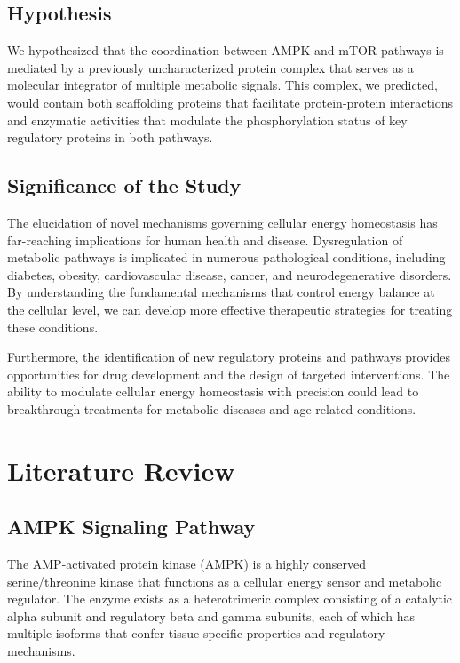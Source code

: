 \documentclass[11
pt,a4paper]{article}
\begin{document}


\subsection{Hypothesis}

We hypothesized that the coordination between AMPK and mTOR pathways is mediated by a previously uncharacterized protein complex that serves as a molecular integrator of multiple metabolic signals. This complex, we predicted, would contain both scaffolding proteins that facilitate protein-protein interactions and enzymatic activities that modulate the phosphorylation status of key regulatory proteins in both pathways.

\subsection{Significance of the Study}

The elucidation of novel mechanisms governing cellular energy homeostasis has far-reaching implications for human health and disease. Dysregulation of metabolic pathways is implicated in numerous pathological conditions, including diabetes, obesity, cardiovascular disease, cancer, and neurodegenerative disorders. By understanding the fundamental mechanisms that control energy balance at the cellular level, we can develop more effective therapeutic strategies for treating these conditions.

Furthermore, the identification of new regulatory proteins and pathways provides opportunities for drug development and the design of targeted interventions. The ability to modulate cellular energy homeostasis with precision could lead to breakthrough treatments for metabolic diseases and age-related conditions.

\section{Literature Review}

\subsection{AMPK Signaling Pathway}

The AMP-activated protein kinase (AMPK) is a highly conserved serine/threonine kinase that functions as a cellular energy sensor and metabolic regulator. The enzyme exists as a heterotrimeric complex consisting of a catalytic alpha subunit and regulatory beta and gamma subunits, each of which has multiple isoforms that confer tissue-specific properties and regulatory mechanisms.
\end{document}
